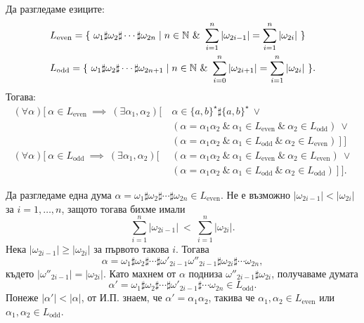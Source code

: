 \begin{prop}
  Да разгледаме езиците:
  \begin{align*}
    & L_{\text{even}} = \{\ \omega_1 \sharp \omega_2 \sharp \cdots \sharp \omega_{2n} \mid n\in\Nat\ \&\ \sum^n_{i=1}\abs{\omega_{2i-1}} = \sum^{n}_{i=1}\abs{\omega_{2i}}\ \}\\
    & L_{\text{odd}} = \{\ \omega_1 \sharp \omega_2 \sharp \cdots \sharp \omega_{2n+1} \mid n\in\Nat\ \&\ \sum^n_{i=0}\abs{\omega_{2i+1}} = \sum^{n}_{i=1}\abs{\omega_{2i}}\ \}.
  \end{align*}
  Тогава:
  \begin{align*}
    (\forall \alpha)[\ \alpha\in L_{\text{even}}\ \implies\ (\exists \alpha_1,\alpha_2)[\ & \alpha \in \{a,b\}^\star\sharp\{a,b\}^\star\ \lor\\
                                                                                        & ( \alpha = \alpha_1\alpha_2\ \&\ \alpha_1 \in L_{\text{even}}\ \&\ \alpha_2 \in L_{\text{odd}})\ \lor\\
                                                                                        &( \alpha = \alpha_1\alpha_2\ \&\ \alpha_1 \in L_{\text{odd}}\ \&\ \alpha_2 \in L_{\text{even}})\ ]\ ]\\
    (\forall \alpha)[\ \alpha\in L_{\text{odd}}\ \implies\ (\exists \alpha_1,\alpha_2)[\ &( \alpha = \alpha_1\alpha_2\ \&\ \alpha_1 \in L_{\text{even}}\ \&\ \alpha_2 \in L_{\text{even}})\ \lor\\
                                                                                        &( \alpha = \alpha_1\alpha_2\ \&\ \alpha_1 \in L_{\text{odd}}\ \&\ \alpha_2 \in L_{\text{odd}})\ ]\ ].
  \end{align*}
\end{prop}
\begin{hint}
  Да разгледаме една дума $\alpha = \omega_1 \sharp \omega_2 \sharp \cdots \sharp \omega_{2n} \in L_{\text{even}}$.
  Не е възможно $|\omega_{2i-1}| < |\omega_{2i}|$ за $i = 1,\dots,n$, защото тогава бихме имали 
  \[\sum^n_{i=1}|\omega_{2i-1}|\ <\ \sum^n_{i=1}|\omega_{2i}|.\]
  Нека $|\omega_{2i-1}| \geq |\omega_{2i}|$ за първото такова $i$.
  Тогава
  \[\alpha = \omega_1 \sharp \omega_2 \sharp \cdots \sharp\omega'_{2i-1}\omega''_{2i-1}\sharp\omega_{2i}\sharp\cdots \omega_{2n},\]
  където $|\omega''_{2i-1}| = |\omega_{2i}|$.
  Като махнем от $\alpha$ подниза $\omega''_{2i-1}\sharp\omega_{2i}$, 
  получаваме думата
  \[\alpha' = \omega_1 \sharp \omega_2 \sharp \cdots \sharp\omega'_{2i-1}\sharp\cdots \omega_{2n} \in L_{\text{odd}}.\]
  Понеже $|\alpha'| < |\alpha|$, от И.П. знаем, че $\alpha' = \alpha_1\alpha_2$, такива че
  $\alpha_1,\alpha_2 \in L_{\text{even}}$ или $\alpha_1,\alpha_2 \in L_{\text{odd}}$.
\end{hint}


